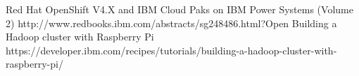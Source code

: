 %
%
%


\begin{publications}
    \publication
        {Red Hat OpenShift V4.X and IBM Cloud Paks on IBM Power Systems (Volume 2)}
        {http://www.redbooks.ibm.com/abstracts/sg248486.html?Open}
    \publication
        {Building a Hadoop cluster with Raspberry Pi}
        {https://developer.ibm.com/recipes/tutorials/building-a-hadoop-cluster-with-raspberry-pi/}
\end{publications}